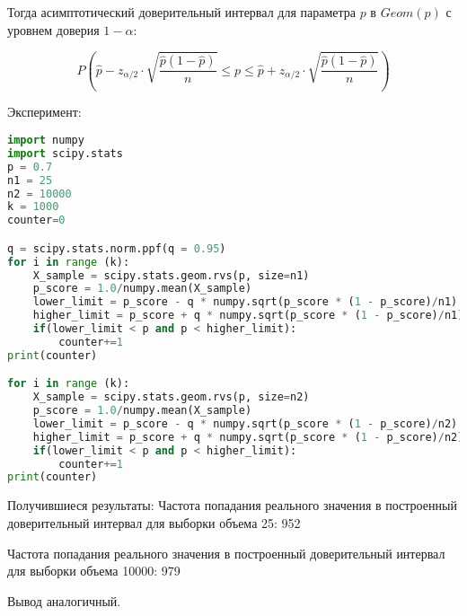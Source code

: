 \documentclass{article}
\begin{document}
Тогда асимптотический доверительный интервал для параметра $p$ в $Geom(p)$ с уровнем доверия $1-\alpha$:

$$P(\widehat{p} - z_{\alpha/2} \cdot \sqrt{\frac{\widehat{p}(1-\widehat{p})}{n}} \leq p \leq\widehat{p} + z_{\alpha/2} \cdot \sqrt{\frac{\widehat{p}(1-\widehat{p})}{n}})$$ 

Эксперимент:

\begin{lstlisting}[language=Python, mathescape=true, breaklines=true]
import numpy
import scipy.stats
p = 0.7
n1 = 25
n2 = 10000
k = 1000
counter=0

q = scipy.stats.norm.ppf(q = 0.95)
for i in range (k):
    X_sample = scipy.stats.geom.rvs(p, size=n1)
    p_score = 1.0/numpy.mean(X_sample)
    lower_limit = p_score - q * numpy.sqrt(p_score * (1 - p_score)/n1)
    higher_limit = p_score + q * numpy.sqrt(p_score * (1 - p_score)/n1)
    if(lower_limit < p and p < higher_limit):
        counter+=1
print(counter)

for i in range (k):
    X_sample = scipy.stats.geom.rvs(p, size=n2)
    p_score = 1.0/numpy.mean(X_sample)
    lower_limit = p_score - q * numpy.sqrt(p_score * (1 - p_score)/n2)
    higher_limit = p_score + q * numpy.sqrt(p_score * (1 - p_score)/n2)
    if(lower_limit < p and p < higher_limit):
        counter+=1
print(counter)
    \end{lstlisting}
    Получившиеся результаты:
    Частота попадания реального значения в построенный доверительный интервал для выборки объема 25: 952

    
    Частота попадания реального значения в построенный доверительный интервал для выборки объема 10000: 979

    Вывод аналогичный.
    
\end{document}
